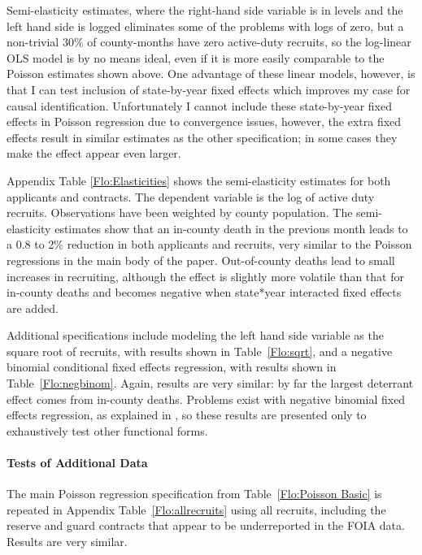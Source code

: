 \documentclass[12pt] {article}
\begin{document}
Semi-elasticity estimates, where the right-hand side variable is in levels and the left hand side is logged eliminates some of the problems with logs of zero, but a non-trivial 30\% of county-months have zero active-duty recruits, so the log-linear OLS model is by no means ideal, even if it is more easily comparable to the Poisson estimates shown above.  One advantage of these linear models, however, is that I can test inclusion of state-by-year fixed effects which improves my case for causal identification. Unfortunately I cannot include these state-by-year fixed effects in Poisson regression due to convergence issues, however, the extra fixed effects result in similar estimates as the other specification; in some cases they make the effect appear even larger. 

Appendix Table \ref{Flo:Elasticities} shows the semi-elasticity estimates for both applicants and contracts. The dependent variable is the log of active duty recruits. Observations have been weighted by county population. The semi-elasticity estimates show that an in-county death
in the previous month leads to a 0.8 to 2\% reduction in both applicants and recruits, very similar to the Poisson regressions in the main body of the paper. Out-of-county deaths lead to small increases in recruiting, although the effect is slightly more volatile than that for in-county deaths and becomes negative when state{*}year interacted fixed effects are added. 

Additional specifications include modeling the left hand side variable as the square root of recruits, with results shown in Table~\ref{Flo:sqrt}, and a negative binomial conditional fixed effects regression, with results shown in Table~\ref{Flo:negbinom}. Again, results are very similar: by far the largest deterrant effect comes from in-county deaths. Problems exist with negative binomial fixed effects regression, as explained in \cite{negbinom}, so these results are presented only to exhaustively test other functional forms. 

\paragraph{Tests of Additional Data}
The main Poisson regression specification from Table~\ref{Flo:Poisson Basic} is repeated in Appendix Table~\ref{Flo:allrecruits} using all recruits, including the reserve and guard contracts that appear to be underreported in the FOIA data. Results are very similar. 
\end{document}
